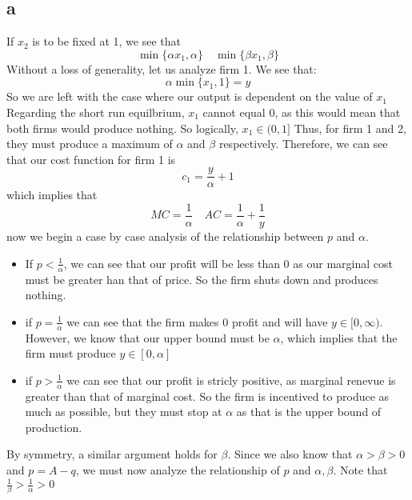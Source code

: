 \documentclass[11pt]{article}
\begin{document}
\subsection*{a}
If $x_2$ is to be fixed at 1, we see that 
\[
\min \{\alpha x_1, \alpha \} \quad \min \{ \beta x_1, \beta \}
\]
Without a loss of generality, let us analyze firm 1. We see that:
\[
\alpha \min \{x_1, 1\} = y
\]
So we are left with the case where our output is dependent on the value of $x_1$ Regarding the short run equilbrium, $x_1$ cannot equal 0, as this would mean that both firms would produce nothing. So logically, $x_1 \in (0,1]$ Thus, for firm 1 and 2, they must produce a maximum of $\alpha$  and $\beta$ respectively. Therefore, we can see that our cost function for firm 1 is 
\[
c_1 = \frac{y}{\alpha} + 1 
\]
which implies that 
\[
MC = \frac{1}{\alpha} \quad AC = \frac{1}{\alpha} + \frac{1}{y}
\]
now we begin a case by case analysis of the relationship between $p$ and $\alpha$.
\begin{itemize}
    \item If $p < \frac{1}{\alpha}$, we can see that our profit will be less than 0 as our marginal cost must be greater han that of price. So the firm shuts down and produces nothing. 
    \item if $p = \frac{1}{\alpha}$ we can see that the firm makes 0 profit and will have $y \in [0,\infty)$. However, we know that our upper bound must be $\alpha$, which implies that the firm must produce $y \in [0, \alpha]$
    \item if $p > \frac{1}{\alpha}$ we can see that our profit is stricly positive, as marginal renevue is greater than that of marginal cost. So the firm is incentived to produce as much as possible, but they must stop at $\alpha$ as that is the upper bound of production.
\end{itemize}
By symmetry, a similar argument holds for $\beta$. Since we also know that $\alpha > \beta > 0$ and $p = A - q$, we must now analyze the relationship of $p$ and $\alpha, \beta$. Note that $\frac{1}{\beta} > \frac{1}{\alpha} > 0$
\end{document}
